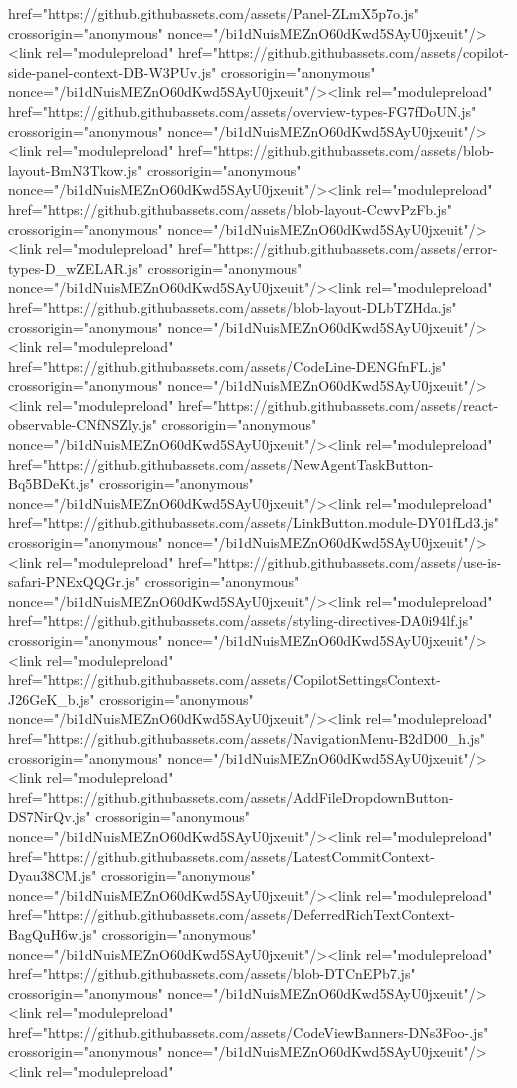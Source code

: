href="https://github.githubassets.com/assets/Panel-ZLmX5p7o.js" crossorigin="anonymous" nonce="/bi1dNuisMEZnO60dKwd5SAyU0jxeuit"/><link rel="modulepreload" href="https://github.githubassets.com/assets/copilot-side-panel-context-DB-W3PUv.js" crossorigin="anonymous" nonce="/bi1dNuisMEZnO60dKwd5SAyU0jxeuit"/><link rel="modulepreload" href="https://github.githubassets.com/assets/overview-types-FG7fDoUN.js" crossorigin="anonymous" nonce="/bi1dNuisMEZnO60dKwd5SAyU0jxeuit"/><link rel="modulepreload" href="https://github.githubassets.com/assets/blob-layout-BmN3Tkow.js" crossorigin="anonymous" nonce="/bi1dNuisMEZnO60dKwd5SAyU0jxeuit"/><link rel="modulepreload" href="https://github.githubassets.com/assets/blob-layout-CcwvPzFb.js" crossorigin="anonymous" nonce="/bi1dNuisMEZnO60dKwd5SAyU0jxeuit"/><link rel="modulepreload" href="https://github.githubassets.com/assets/error-types-D_wZELAR.js" crossorigin="anonymous" nonce="/bi1dNuisMEZnO60dKwd5SAyU0jxeuit"/><link rel="modulepreload" href="https://github.githubassets.com/assets/blob-layout-DLbTZHda.js" crossorigin="anonymous" nonce="/bi1dNuisMEZnO60dKwd5SAyU0jxeuit"/><link rel="modulepreload" href="https://github.githubassets.com/assets/CodeLine-DENGfnFL.js" crossorigin="anonymous" nonce="/bi1dNuisMEZnO60dKwd5SAyU0jxeuit"/><link rel="modulepreload" href="https://github.githubassets.com/assets/react-observable-CNfNSZly.js" crossorigin="anonymous" nonce="/bi1dNuisMEZnO60dKwd5SAyU0jxeuit"/><link rel="modulepreload" href="https://github.githubassets.com/assets/NewAgentTaskButton-Bq5BDeKt.js" crossorigin="anonymous" nonce="/bi1dNuisMEZnO60dKwd5SAyU0jxeuit"/><link rel="modulepreload" href="https://github.githubassets.com/assets/LinkButton.module-DY01fLd3.js" crossorigin="anonymous" nonce="/bi1dNuisMEZnO60dKwd5SAyU0jxeuit"/><link rel="modulepreload" href="https://github.githubassets.com/assets/use-is-safari-PNExQQGr.js" crossorigin="anonymous" nonce="/bi1dNuisMEZnO60dKwd5SAyU0jxeuit"/><link rel="modulepreload" href="https://github.githubassets.com/assets/styling-directives-DA0i94lf.js" crossorigin="anonymous" nonce="/bi1dNuisMEZnO60dKwd5SAyU0jxeuit"/><link rel="modulepreload" href="https://github.githubassets.com/assets/CopilotSettingsContext-J26GeK_b.js" crossorigin="anonymous" nonce="/bi1dNuisMEZnO60dKwd5SAyU0jxeuit"/><link rel="modulepreload" href="https://github.githubassets.com/assets/NavigationMenu-B2dD00_h.js" crossorigin="anonymous" nonce="/bi1dNuisMEZnO60dKwd5SAyU0jxeuit"/><link rel="modulepreload" href="https://github.githubassets.com/assets/AddFileDropdownButton-DS7NirQv.js" crossorigin="anonymous" nonce="/bi1dNuisMEZnO60dKwd5SAyU0jxeuit"/><link rel="modulepreload" href="https://github.githubassets.com/assets/LatestCommitContext-Dyau38CM.js" crossorigin="anonymous" nonce="/bi1dNuisMEZnO60dKwd5SAyU0jxeuit"/><link rel="modulepreload" href="https://github.githubassets.com/assets/DeferredRichTextContext-BagQuH6w.js" crossorigin="anonymous" nonce="/bi1dNuisMEZnO60dKwd5SAyU0jxeuit"/><link rel="modulepreload" href="https://github.githubassets.com/assets/blob-DTCnEPb7.js" crossorigin="anonymous" nonce="/bi1dNuisMEZnO60dKwd5SAyU0jxeuit"/><link rel="modulepreload" href="https://github.githubassets.com/assets/CodeViewBanners-DNs3Foo-.js" crossorigin="anonymous" nonce="/bi1dNuisMEZnO60dKwd5SAyU0jxeuit"/><link rel="modulepreload" 